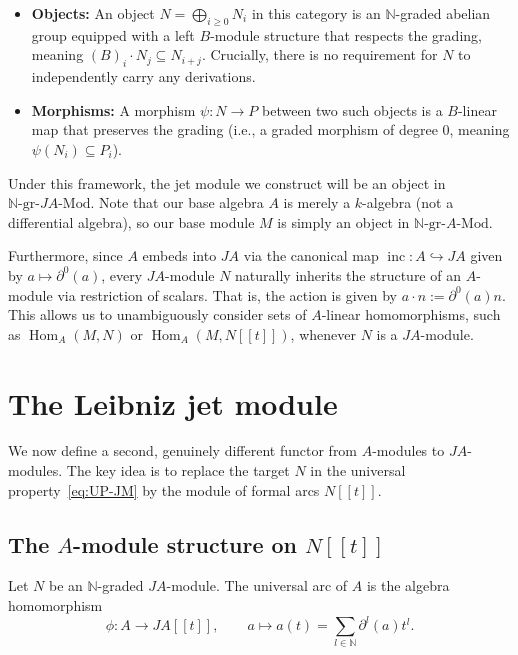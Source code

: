 \documentclass[a4paper, 12pt]{amsart}
\theoremstyle{definition}
\theoremstyle{remark}
\begin{document}
\begin{itemize}
  \item \textbf{Objects:} An object $N = \bigoplus_{i \ge 0} N_i$ in this category is an $\mathbb{N}$-graded abelian group equipped with a left $B$-module structure that respects the grading, meaning $(B)_i \cdot N_j \subseteq N_{i+j}$. Crucially, there is no requirement for $N$ to independently carry any derivations.
  \item \textbf{Morphisms:} A morphism $\psi: N \to P$ between two such objects is a $B$-linear map that preserves the grading (i.e., a graded morphism of degree $0$, meaning $\psi(N_i) \subseteq P_i$).
\end{itemize}

Under this framework, the jet module we construct will be an object in $\mathbb{N}\text{-gr-}JA\text{-Mod}$. Note that our base algebra $A$ is merely a $k$-algebra (not a differential algebra), so our base module $M$ is simply an object in $\mathbb{N}\text{-gr-}A\text{-Mod}$. 

Furthermore, since $A$ embeds into $JA$ via the canonical map $\operatorname{inc}: A \hookrightarrow JA$ given by $a \mapsto \partial^0(a)$, every $JA$-module $N$ naturally inherits the structure of an $A$-module via restriction of scalars. That is, the action is given by $a \cdot n := \partial^0(a) n$. This allows us to unambiguously consider sets of $A$-linear homomorphisms, such as $\operatorname{Hom}_A(M, N)$ or $\operatorname{Hom}_A(M, N[[t]])$, whenever $N$ is a $JA$-module.

\section{The Leibniz jet module}
\label{sec:leibniz-jet-module}

We now define a second, genuinely different functor from $A$-modules to $JA$-modules.
The key idea is to replace the target $N$ in the universal property~\eqref{eq:UP-JM}
by the module of formal arcs $N[[t]]$.

\subsection{The $A$-module structure on $N[[t]]$}
\label{sec:A-module-Nt}

Let $N$ be an $\mathbb{N}$-graded $JA$-module.
The universal arc of $A$ is the algebra homomorphism
\begin{equation*}
  \phi: A \to JA[[t]], \qquad a \mapsto a(t) = \sum_{l \in \mathbb{N}} \partial^l(a)t^l.
\end{equation*}
\end{document}
